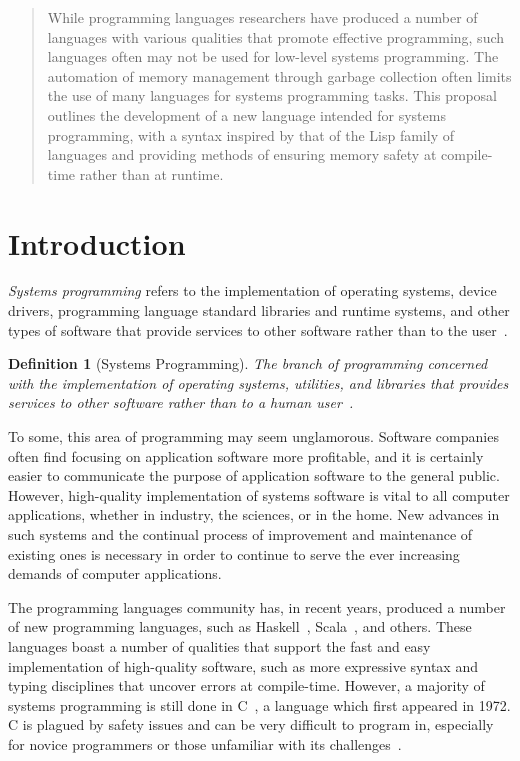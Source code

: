 \documentclass[11pt,a4paper]{article}
\theoremstyle{break}
\newtheorem{defn}{Definition}
\begin{document}
\begin{quote}
While programming languages researchers have produced a number of languages with various qualities that promote effective programming, such languages often may not be used for low-level systems programming. The automation of memory management through garbage collection often limits the use of many languages for systems programming tasks.
This proposal outlines the development of a new language intended for systems programming, with a syntax inspired by that of the Lisp family of languages and providing methods of ensuring memory safety at compile-time rather than at runtime.
\end{quote}

\section{Introduction}
\label{sec:introduction}
\vspace*{-.1in}

\textit{Systems programming} refers to the implementation of operating systems, device drivers, programming language standard libraries and runtime systems, and other types of software that provide services to other software rather than to the user~\cite{Narten:2003:SP:1074100.1074850,Shapiro:2006:PLC:1215995.1216004}.

\begin{defn}[Systems Programming]
The branch of programming concerned with the implementation of operating systems, utilities, and libraries that provides services to other software rather than to a human user~\cite{Narten:2003:SP:1074100.1074850}.
\end{defn}

To some, this area of programming may seem unglamorous. Software companies often find focusing on application software more profitable, and it is certainly easier to communicate the purpose of application software to the general public.
However, high-quality implementation of systems software is vital to all computer applications, whether in industry, the sciences, or in the home. New advances in such systems and the continual process of improvement and maintenance of existing ones is necessary in order to continue to serve the ever increasing demands of computer applications.

The programming languages community has, in recent years, produced a number of new programming languages, such as Haskell~\cite{jones2003haskell,hudak1992report}, Scala~\cite{odersky2004scala,odersky2004overview}, and others. These languages boast a number of qualities that support the fast and easy implementation of high-quality software, such as more expressive syntax and typing disciplines that uncover errors at compile-time. However, a majority of systems programming is still done in C~\cite{kernighan1988c}, a language which first appeared in 1972. C is plagued by safety issues and can be very difficult to program in, especially for novice programmers or those unfamiliar with its challenges~\cite{Shapiro:2006:PLC:1215995.1216004,Ray:2014:LSS:2635868.2635922,Bhattacharya:2011:APL:1985793.1985817}.
\end{document}
